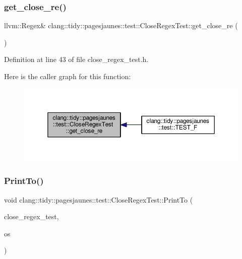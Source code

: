 \subsubsection{\texorpdfstring{get\+\_\+close\+\_\+re()}{get\_close\_re()}}
{\footnotesize\ttfamily llvm\+::\+Regex\& clang\+::tidy\+::pagesjaunes\+::test\+::\+Close\+Regex\+Test\+::get\+\_\+close\+\_\+re (\begin{DoxyParamCaption}{ }\end{DoxyParamCaption})\hspace{0.3cm}{\ttfamily [inline]}}



Definition at line 43 of file close\+\_\+regex\+\_\+test.\+h.

Here is the caller graph for this function\+:
\nopagebreak
\begin{figure}[H]
\begin{center}
\leavevmode
\includegraphics[width=350pt]{classclang_1_1tidy_1_1pagesjaunes_1_1test_1_1_close_regex_test_a7e45686a81da60c71888f5021a679ff9_icgraph}
\end{center}
\end{figure}
\mbox{\label{classclang_1_1tidy_1_1pagesjaunes_1_1test_1_1_close_regex_test_a6c2e158e217ef8d330ef4a5799bbce6d}} 
\subsubsection{\texorpdfstring{Print\+To()}{PrintTo()}}
{\footnotesize\ttfamily void clang\+::tidy\+::pagesjaunes\+::test\+::\+Close\+Regex\+Test\+::\+Print\+To (\begin{DoxyParamCaption}\item[{const \hyperlink{classclang_1_1tidy_1_1pagesjaunes_1_1test_1_1_close_regex_test}{Close\+Regex\+Test} \&}]{close\+\_\+regex\+\_\+test,  }\item[{\+::std\+::ostream $\ast$}]{os }\end{DoxyParamCaption})}



